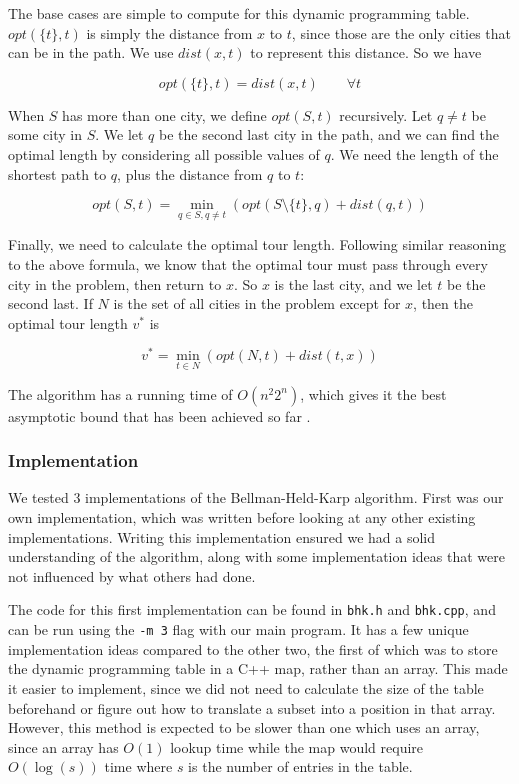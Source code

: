 \documentclass[11pt]{article}
\begin{document}
The base cases are simple to compute for this dynamic programming table. $opt(\{ t \} , t)$ is simply the distance from $x$ to $t$, since those are the only cities that can be in the path. We use $dist(x,t)$ to represent this distance. So we have

\[ opt(\{ t \}, t) = dist(x,t) \qquad \forall t \]

When $S$ has more than one city, we define $opt(S,t)$ recursively. Let $q \neq t$ be some city in $S$. We let $q$ be the second last city in the path, and we can find the optimal length by considering all possible values of $q$. We need the length of the shortest path to $q$, plus the distance from $q$ to $t$:

\[ opt(S,t) = \min_{q \in S, q \neq t} ( opt(S \setminus \{ t \} , q) + dist(q, t) ) \]

Finally, we need to calculate the optimal tour length. Following similar reasoning to the above formula, we know that the optimal tour must pass through every city in the problem, then return to $x$. So $x$ is the last city, and we let $t$ be the second last. If $N$ is the set of all cities in the problem except for $x$, then the optimal tour length $v^*$ is

\[ v^* = \min_{t \in N} ( opt(N , t) + dist(t, x) ) \]

The algorithm has a running time of $O(n^2 2^n)$, which gives it the best asymptotic bound that has been achieved so far \cite{bico}.

\subsubsection{Implementation}

We tested 3 implementations of the Bellman-Held-Karp algorithm. First was our own implementation, which was written before looking at any other existing implementations. Writing this implementation ensured we had a solid understanding of the algorithm, along with some implementation ideas that were not influenced by what others had done.

The code for this first implementation can be found in \texttt{bhk.h} and \texttt{bhk.cpp}, and can be run using the \texttt{-m 3} flag with our main program. It has a few unique implementation ideas compared to the other two, the first of which was to store the dynamic programming table in a C++ map, rather than an array. This made it easier to implement, since we did not need to calculate the size of the table beforehand or figure out how to translate a subset into a position in that array. However, this method is expected to be slower than one which uses an array, since an array has $O(1)$ lookup time while the map would require $O(\log(s))$ time where $s$ is the number of entries in the table.
\end{document}
